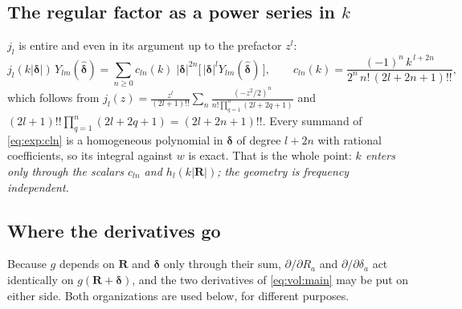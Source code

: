 \subsection{\texorpdfstring{The regular factor as a power series in $k$}{The regular factor as a power series in k}}
\label{sec:exp:kser}

$j_l$ is entire and even in its argument up to the prefactor $z^l$:
\begin{equation}
j_l(k|\boldsymbol{\delta}|)\,Y_{lm}(\hat{\boldsymbol{\delta}})
= \sum_{n\ge 0} c_{ln}(k)\;
  |\boldsymbol{\delta}|^{2n}\bigl[\,|\boldsymbol{\delta}|^{l}
  Y_{lm}(\hat{\boldsymbol{\delta}})\,\bigr],
\qquad
c_{ln}(k) = \frac{(-1)^n\,k^{\,l+2n}}{2^n\,n!\,(2l+2n+1)!!},
\label{eq:exp:cln}
\end{equation}
which follows from $j_l(z) = \frac{z^l}{(2l+1)!!}\sum_n \frac{(-z^2/2)^n}{n!\prod_{q=1}^{n}
(2l+2q+1)}$ and $(2l+1)!!\prod_{q=1}^n(2l+2q+1) = (2l+2n+1)!!$. Every summand of
\eqref{eq:exp:cln} is a homogeneous polynomial in $\boldsymbol{\delta}$ of degree
$l + 2n$ with rational coefficients, so its integral against $w$ is exact. That is the
whole point: \emph{$k$ enters only through the scalars $c_{ln}$ and $h_l(k|\mathbf{R}|)$;
the geometry is frequency independent.}

\subsection{Where the derivatives go}
\label{sec:exp:der}

Because $g$ depends on $\mathbf{R}$ and $\boldsymbol{\delta}$ only through their sum,
$\partial/\partial R_a$ and $\partial/\partial\delta_a$ act identically on
$g(\mathbf{R}+\boldsymbol{\delta})$, and the two derivatives of \eqref{eq:vol:main} may be
put on either side. Both organizations are used below, for different purposes.

